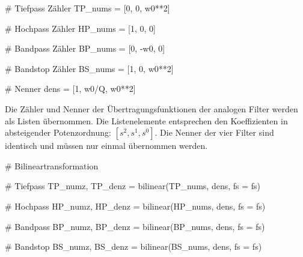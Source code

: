 \documentclass[
  ngerman,
  letterpaper,
  DIV=11]{scrreprt}
\newenvironment{Shaded}{\begin{snugshade}}{\end{snugshade}}
\newcommand{\CommentTok}[1]{\textcolor[rgb]{0.37,0.37,0.37}{#1}}
\newcommand{\DecValTok}[1]{\textcolor[rgb]{0.68,0.00,0.00}{#1}}
\newcommand{\NormalTok}[1]{\textcolor[rgb]{0.00,0.23,0.31}{#1}}
\newcommand{\OperatorTok}[1]{\textcolor[rgb]{0.37,0.37,0.37}{#1}}
\begin{document}
\begin{Shaded}
\begin{Highlighting}[]
\CommentTok{\# Tiefpass Zähler}
\NormalTok{TP\_nums }\OperatorTok{=}\NormalTok{ [}\DecValTok{0}\NormalTok{, }\DecValTok{0}\NormalTok{, w0}\OperatorTok{**}\DecValTok{2}\NormalTok{]}

\CommentTok{\# Hochpass Zähler}
\NormalTok{HP\_nums }\OperatorTok{=}\NormalTok{ [}\DecValTok{1}\NormalTok{, }\DecValTok{0}\NormalTok{, }\DecValTok{0}\NormalTok{]}

\CommentTok{\# Bandpass Zähler}
\NormalTok{BP\_nums }\OperatorTok{=}\NormalTok{  [}\DecValTok{0}\NormalTok{, }\OperatorTok{{-}}\NormalTok{w0, }\DecValTok{0}\NormalTok{]}

\CommentTok{\# Bandstop Zähler}
\NormalTok{BS\_nums }\OperatorTok{=}\NormalTok{ [}\DecValTok{1}\NormalTok{, }\DecValTok{0}\NormalTok{, w0}\OperatorTok{**}\DecValTok{2}\NormalTok{]}

\CommentTok{\# Nenner}
\NormalTok{dens }\OperatorTok{=}\NormalTok{ [}\DecValTok{1}\NormalTok{, w0}\OperatorTok{/}\NormalTok{Q, w0}\OperatorTok{**}\DecValTok{2}\NormalTok{]}
\end{Highlighting}
\end{Shaded}

Die Zähler und Nenner der Übertragungsfunktionen der analogen Filter
werden als Listen übernommen. Die Listenelemente entsprechen den
Koeffizienten in absteigender Potenzordnung: \([s^2, s^1, s^0]\). Die
Nenner der vier Filter sind identisch und müssen nur einmal übernommen
werden.

\begin{Shaded}
\begin{Highlighting}[]
\CommentTok{\# Bilineartransformation}

\CommentTok{\# Tiefpass}
\NormalTok{TP\_numz, TP\_denz }\OperatorTok{=}\NormalTok{ bilinear(TP\_nums, dens, fs }\OperatorTok{=}\NormalTok{ fs)}

\CommentTok{\# Hochpass}
\NormalTok{HP\_numz, HP\_denz }\OperatorTok{=}\NormalTok{ bilinear(HP\_nums, dens, fs }\OperatorTok{=}\NormalTok{ fs)}

\CommentTok{\# Bandpass}
\NormalTok{BP\_numz, BP\_denz }\OperatorTok{=}\NormalTok{ bilinear(BP\_nums, dens, fs }\OperatorTok{=}\NormalTok{ fs)}

\CommentTok{\# Bandstop}
\NormalTok{BS\_numz, BS\_denz }\OperatorTok{=}\NormalTok{ bilinear(BS\_nums, dens, fs }\OperatorTok{=}\NormalTok{ fs)}
\end{Highlighting}
\end{Shaded}
\end{document}
